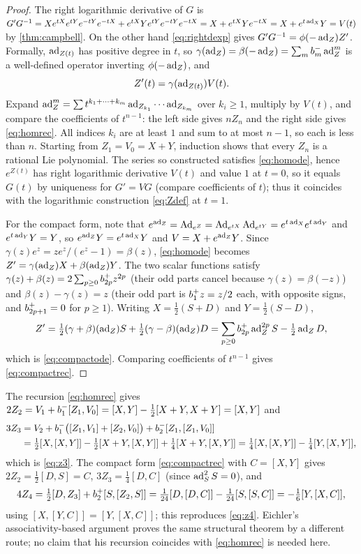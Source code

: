 \begin{proof}
The right logarithmic derivative of $G$ is
$G'G^{-1}=Xe^{tX}e^{tY}e^{-tY}e^{-tX}+e^{tX}Ye^{tY}e^{-tY}e^{-tX}
=X+e^{tX}Ye^{-tX}=X+e^{t\operatorname{ad}_X}Y=V(t)$ by \cref{thm:campbell}. On the other
hand \eqref{eq:rightdexp} gives $G'G^{-1}=\phi(-\operatorname{ad}_Z)Z'$. Formally,
$\operatorname{ad}_{Z(t)}$ has positive degree in $t$, so $\gamma(\operatorname{ad}_Z)=\beta(-\operatorname{ad}_Z)
=\sum_mb^{-}_{m}\operatorname{ad}_Z^m$ is a well-defined operator inverting
$\phi(-\operatorname{ad}_Z)$, and
\begin{equation}\label{eq:homode}
 Z'(t)=\gamma(\operatorname{ad}_{Z(t)})V(t).
\end{equation}
Expand $\operatorname{ad}_Z^m=\sum t^{k_1+\cdots+k_m}\operatorname{ad}_{Z_{k_1}}\cdots\operatorname{ad}_{Z_{k_m}}$
over $k_i\geq1$, multiply by $V(t)$, and compare the coefficients of
$t^{n-1}$: the left side gives $nZ_n$ and the right side gives
\eqref{eq:homrec}. All indices $k_i$ are at least $1$ and sum to at most
$n-1$, so each is less than $n$. Starting from $Z_1=V_0=X+Y$, induction
shows that every $Z_n$ is a rational Lie polynomial. The series so
constructed satisfies \eqref{eq:homode}, hence $e^{Z(t)}$ has right
logarithmic derivative $V(t)$ and value $1$ at $t=0$, so it equals
$G(t)$ by uniqueness for $G'=VG$ (compare coefficients of $t$); thus it
coincides with the logarithmic construction \eqref{eq:Zdef} at $t=1$.

For the compact form, note that $e^{\operatorname{ad}_Z}=\operatorname{Ad}_{e^Z}=\operatorname{Ad}_{e^{tX}}\operatorname{Ad}_{e^{tY}}
=e^{t\operatorname{ad}_X}e^{t\operatorname{ad}_Y}$ and $e^{t\operatorname{ad}_Y}Y=Y$, so $e^{\operatorname{ad}_Z}Y=e^{t\operatorname{ad}_X}Y$ and
$V=X+e^{\operatorname{ad}_Z}Y$. Since $\gamma(z)e^z=ze^z/(e^z-1)=\beta(z)$,
\eqref{eq:homode} becomes $Z'=\gamma(\operatorname{ad}_Z)X+\beta(\operatorname{ad}_Z)Y$. The two scalar
functions satisfy $\gamma(z)+\beta(z)=2\sum_{p\geq0}b^{+}_{2p}z^{2p}$ (their
odd parts cancel because $\gamma(z)=\beta(-z)$) and
$\beta(z)-\gamma(z)=z$ (their odd part is $b^{+}_{1}z=z/2$ each, with
opposite signs, and $b^{+}_{2p+1}=0$ for $p\geq1$). Writing
$X=\frac12(S+D)$ and $Y=\frac12(S-D)$,
\[
 Z'=\tfrac12(\gamma+\beta)(\operatorname{ad}_Z)S+\tfrac12(\gamma-\beta)(\operatorname{ad}_Z)D
 =\sum_{p\geq0}b^{+}_{2p}\operatorname{ad}_Z^{2p}S-\tfrac12\operatorname{ad}_ZD,
\]
which is \eqref{eq:compactode}. Comparing coefficients of $t^{n-1}$ gives
\eqref{eq:compactrec}.
\end{proof}
The recursion \eqref{eq:homrec} gives $2Z_2=V_1+b^{-}_{1}[Z_1,V_0]
=[X,Y]-\tfrac12[X+Y,X+Y]=[X,Y]$ and
\begin{align*}
 3Z_3&=V_2+b^{-}_{1}\bigl([Z_1,V_1]+[Z_2,V_0]\bigr)+b^{-}_{2}[Z_1,[Z_1,V_0]]\\
 &=\tfrac12[X,[X,Y]]-\tfrac12[X+Y,[X,Y]]+\tfrac14[X+Y,[X,Y]]
 =\tfrac14[X,[X,Y]]-\tfrac14[Y,[X,Y]],
\end{align*}
which is \eqref{eq:z3}. The compact form \eqref{eq:compactrec} with
$C=[X,Y]$ gives $2Z_2=\tfrac12[D,S]=C$, $3Z_3=\tfrac14[D,C]$ (since
$\operatorname{ad}_S^2S=0$), and
\[
 4Z_4=\tfrac12[D,Z_3]+b^{+}_{2}[S,[Z_2,S]]
 =\tfrac1{24}[D,[D,C]]-\tfrac1{24}[S,[S,C]]
 =-\tfrac16[Y,[X,C]],
\]
using $[X,[Y,C]]=[Y,[X,C]]$; this reproduces \eqref{eq:z4}. Eichler's
associativity-based argument \cite{eichler} proves the same structural
theorem by a different route; no claim that his recursion coincides with
\eqref{eq:homrec} is needed here.

